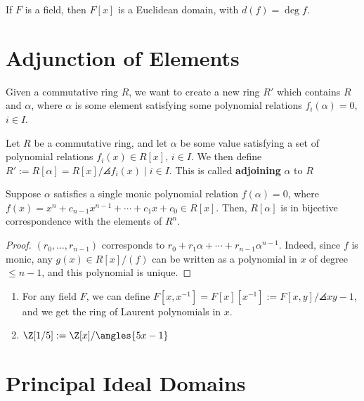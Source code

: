 \begin{cor}
    If $F$ is a field, then $F[x]$ is a Euclidean domain, with $d(f)=\deg f$.
\end{cor}

\section{Adjunction of Elements}

Given a commutative ring $R$, we want to create a new ring $R'$ which contains $R$ and $\alpha$, where $\alpha$ is some element satisfying some polynomial relations $f_i(\alpha)=0$, $i \in I$.

\begin{defn}
    Let $R$ be a commutative ring, and let $\alpha$ be some value satisfying a set of polynomial relations $f_i(x) \in R[x]$, $i \in I$. We then define $R':= R[\alpha] = R[x]/\angles{f_i(x) \mid i \in I}$. This is called \textbf{adjoining} $\alpha$ to $R$
\end{defn}

\begin{notebox*}
    Suppose $\alpha$ satisfies a single monic polynomial relation $f(\alpha ) =0$, where $f(x) = x^n + c_{n-1}x^{n-1}+\cdots + c_1x+c_0 \in R[x]$. Then, $R[\alpha]$ is in bijective correspondence with the elements of $R^n$.
\end{notebox*}

\begin{proof}
    $(r_0,\dots,r_{n-1})$ corresponds to $r_0 + r_1\alpha +\cdots + r_{n-1}\alpha^{n-1}$. Indeed, since $f$ is monic, any $g(x) \in R[x] /(f)$ can be written as a polynomial in $x$ of degree $\leq n-1$, and this polynomial is unique.
\end{proof}

\begin{ex}
    \begin{enumerate}
        \item For any field $F$, we can define $F[x,x^{-1}]=F[x][x^{-1}]:=F[x,y]/\angles{xy-1}$, and we get the ring of Laurent polynomials in $x$.
        \item $\Z[1/5]:= \Z[x]/\angles{5x-1}$
    \end{enumerate}
\end{ex}

\section{Principal Ideal Domains}

